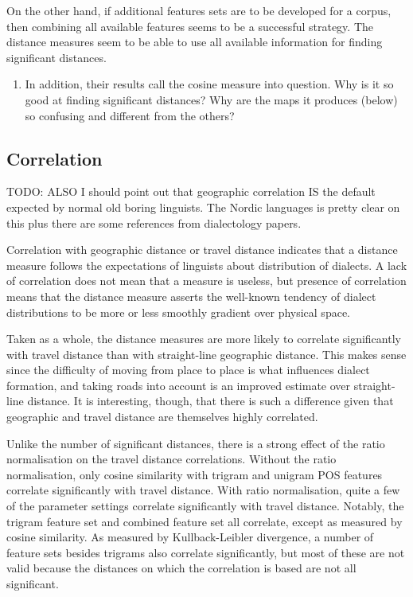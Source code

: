 On the other hand, if additional features sets are to be developed for
a corpus, then combining all available features seems to be a
successful strategy. The distance measures seem to be able to use all
available information for finding significant distances.

\begin{enumerate}
\item In addition, their results call the cosine measure into question. Why is it so
  good at finding significant distances? Why are the maps it produces (below) so
  confusing and different from the others?
\end{enumerate}
\subsection{Correlation}
TODO: ALSO I should point out that geographic correlation IS the
default expected by normal old boring linguists. The Nordic languages
is pretty clear on this plus there are some references from
dialectology papers.

Correlation with geographic distance or travel distance indicates that
a distance measure follows the expectations of linguists about
distribution of dialects. A lack of correlation does not mean that a
measure is useless, but presence of correlation means that the
distance measure asserts the well-known tendency of dialect
distributions to be more or less smoothly gradient over physical
space.

Taken as a whole, the distance measures are more likely to correlate
significantly with travel distance than with straight-line geographic
distance. This makes sense since the difficulty of moving from place
to place is what influences dialect formation, and taking roads into
account is an improved estimate over straight-line distance. It is
interesting, though, that there is such a difference given that geographic
and travel distance are themselves highly correlated.

Unlike the number of significant distances, there is a strong effect
of the ratio normalisation on the travel distance
correlations. Without the ratio normalisation, only cosine similarity
with trigram and unigram POS features correlate significantly with
travel distance. With ratio normalisation, quite a few of the
parameter settings correlate significantly with travel
distance. Notably, the trigram feature set and combined feature set
all correlate, except as measured by cosine similarity. As measured by
Kullback-Leibler divergence, a number of feature sets besides trigrams
also correlate significantly, but most of these are not valid because
the distances on which the correlation is based are not all significant.

